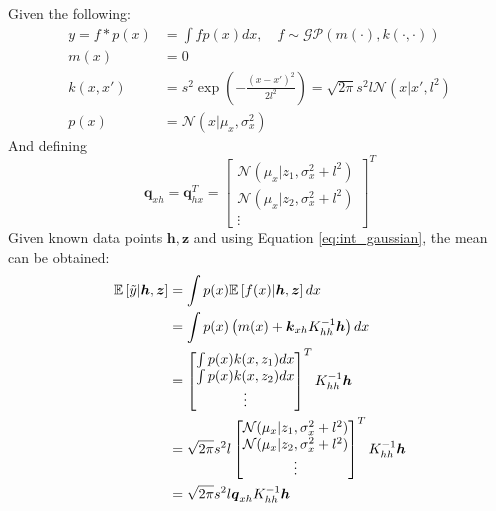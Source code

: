 \documentclass{article}
\begin{document}
Given the following:
\begin{equation}
    \begin{aligned}
        y=f\ast p(x)&=\int fp(x)dx, \quad f\sim\mathcal{GP}(m(\cdot), k(\cdot, \cdot)) \\
        m(x)&=0 \\
        k(x,x')&=s^2 \exp(-\frac{(x-x')^2}{2l^2})=\sqrt{2\pi}s^2l\mathcal{N}(x|x',l^2) \\
        p(x)&=\mathcal{N}(x|\mu_x,\sigma_x^2)
    \end{aligned}
\end{equation}
And defining
\begin{equation}
    \boldsymbol{q}_{xh}=\boldsymbol{q}_{hx}^T=\begin{bmatrix}
        \mathcal{N}(\mu_x|z_1,\sigma_x^2+l^2) \\
        \mathcal{N}(\mu_x|z_2,\sigma_x^2+l^2) \\
        \vdots
    \end{bmatrix}^T
\end{equation}
Given known data points $\boldsymbol{h}, \boldsymbol{z}$ and using Equation \ref{eq:int_gaussian}, the mean can be obtained:
\begin{equation}
    \begin{aligned}
        \mathbb{E}\left[\Tilde{y}|\boldsymbol{h},\boldsymbol{z}\right]&=\int p(x)\mathbb{E}\left[f(x)|\boldsymbol{h},\boldsymbol{z}\right]dx \\
        &=\int p(x)\left(m(x)+\boldsymbol{k}_{xh}K_{hh}^{-1}\boldsymbol{h}\right)dx \\
        &=\begin{bmatrix}
            \int p(x)k(x,z_1)dx \\
            \int p(x)k(x,z_2)dx \\
            \vdots
        \end{bmatrix}^T K_{hh}^{-1}\boldsymbol{h} \\
        &=\sqrt{2\pi}s^2l\begin{bmatrix}
            \mathcal{N}(\mu_x|z_1,\sigma_x^2+l^2) \\
            \mathcal{N}(\mu_x|z_2,\sigma_x^2+l^2) \\
            \vdots
        \end{bmatrix}^TK_{hh}^{-1}\boldsymbol{h} \\
        &=\sqrt{2\pi}s^2l\boldsymbol{q}_{xh}K_{hh}^{-1}\boldsymbol{h}
    \end{aligned}
\end{equation}
\end{document}
